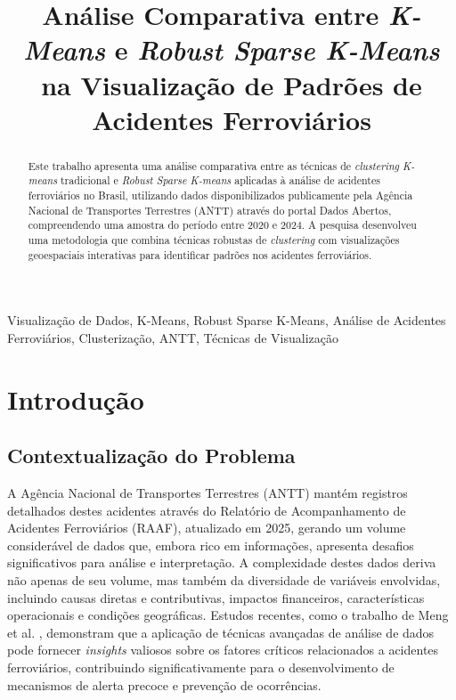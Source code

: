 \documentclass[conference]{IEEEtran}
\begin{document}
\title{Análise Comparativa entre \textit{K-Means} e \textit{Robust Sparse K-Means} na Visualização de Padrões de Acidentes Ferroviários}

\author{
}

\maketitle

\begin{abstract}
Este trabalho apresenta uma análise comparativa entre as técnicas de \textit{clustering} \textit{K-means} tradicional e \textit{Robust Sparse K-means} aplicadas à análise de acidentes ferroviários no Brasil, utilizando dados disponibilizados publicamente pela Agência Nacional de Transportes Terrestres (ANTT) através do portal Dados Abertos, compreendendo uma amostra do período entre 2020 e 2024. A pesquisa desenvolveu uma metodologia que combina técnicas robustas de \textit{clustering} com visualizações geoespaciais interativas para identificar padrões nos acidentes ferroviários.
\end{abstract}

\begin{IEEEkeywords}
Visualização de Dados, K-Means, Robust Sparse K-Means, Análise de Acidentes Ferroviários, Clusterização, ANTT, Técnicas de Visualização
\end{IEEEkeywords}

\section{Introdução}
\subsection{Contextualização do Problema}

A Agência Nacional de Transportes Terrestres (ANTT) mantém registros detalhados destes acidentes através do Relatório de Acompanhamento de Acidentes Ferroviários (RAAF), atualizado em 2025, gerando um volume considerável de dados que, embora rico em informações, apresenta desafios significativos para análise e interpretação. A complexidade destes dados deriva não apenas de seu volume, mas também da diversidade de variáveis envolvidas, incluindo causas diretas e contributivas, impactos financeiros, características operacionais e condições geográficas. Estudos recentes, como o trabalho de Meng et al. \cite{b6}, demonstram que a aplicação de técnicas avançadas de análise de dados pode fornecer \textit{insights} valiosos sobre os fatores críticos relacionados a acidentes ferroviários, contribuindo significativamente para o desenvolvimento de mecanismos de alerta precoce e prevenção de ocorrências.
\end{document}

